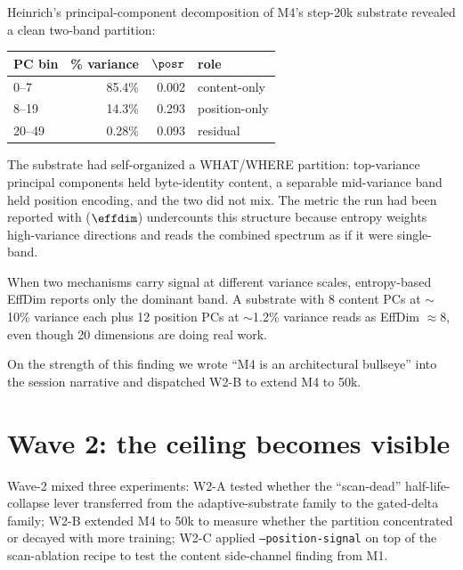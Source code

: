 Heinrich's principal-component decomposition of M4's step-20k substrate revealed a clean two-band partition:

\begin{center}
\begin{tabular}{lrrl}
\toprule
PC bin & \% variance & $\posr$ & role \\
\midrule
0--7   & 85.4\% & 0.002 & content-only \\
8--19  & 14.3\% & 0.293 & position-only \\
20--49 & 0.28\% & 0.093 & residual \\
\bottomrule
\end{tabular}
\end{center}

The substrate had self-organized a WHAT/WHERE partition: top-variance principal components held byte-identity content, a separable mid-variance band held position encoding, and the two did not mix. The metric the run had been reported with ($\effdim$) undercounts this structure because entropy weights high-variance directions and reads the combined spectrum as if it were single-band.

\begin{observation}
When two mechanisms carry signal at different variance scales, entropy-based EffDim reports only the dominant band. A substrate with 8 content PCs at $\sim$10\% variance each plus 12 position PCs at $\sim$1.2\% variance reads as EffDim $\approx 8$, even though 20 dimensions are doing real work.
\end{observation}

On the strength of this finding we wrote ``M4 is an architectural bullseye'' into the session narrative and dispatched W2-B to extend M4 to 50k.

\section{Wave 2: the ceiling becomes visible}

Wave-2 mixed three experiments: W2-A tested whether the ``scan-dead'' half-life-collapse lever transferred from the adaptive-substrate family to the gated-delta family; W2-B extended M4 to 50k to measure whether the partition concentrated or decayed with more training; W2-C applied \texttt{--position-signal} on top of the scan-ablation recipe to test the content side-channel finding from M1.

